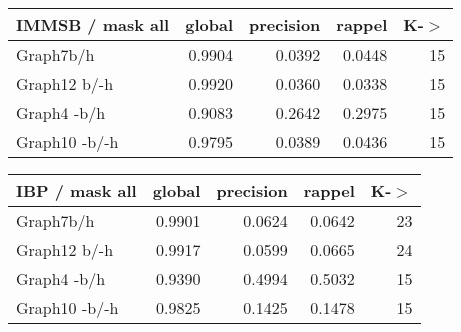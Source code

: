 \begin{table*} 
    \caption{K = 15}
	\begin{minipage}[h]{0.45\linewidth} 
\begin{tabular}{lrrrr}
\hline
 IMMSB / mask all   &   global &   precision &   rappel &     K-\ensuremath{>} \\
\hline
 Graph7b/h          &   0.9904 &      0.0392 &   0.0448 & 15 \\
 Graph12 b/-h       &   0.9920 &      0.0360 &   0.0338 & 15 \\
 Graph4 -b/h        &   0.9083 &      0.2642 &   0.2975 & 15 \\
 Graph10 -b/-h      &   0.9795 &      0.0389 &   0.0436 & 15 \\
\hline
\end{tabular}
\end{minipage}
\hspace{0.5cm}
\begin{minipage}[h]{0.45\linewidth}
\begin{tabular}{lrrrr}
\hline
 IBP / mask all   &   global &   precision &   rappel &     K-\ensuremath{>} \\
\hline
 Graph7b/h        &   0.9901 &      0.0624 &   0.0642 & 23 \\
 Graph12 b/-h     &   0.9917 &      0.0599 &   0.0665 & 24 \\
 Graph4 -b/h      &   0.9390 &      0.4994 &   0.5032 & 15 \\
 Graph10 -b/-h    &   0.9825 &      0.1425 &   0.1478 & 15 \\
\hline
\end{tabular}
\end{minipage}
\end{table*}


